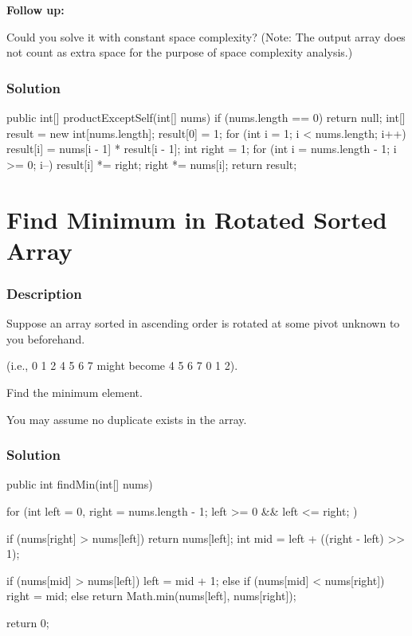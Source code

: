\textbf{Follow up:}

Could you solve it with constant space complexity? (Note: The output array does not count as extra space for the purpose of space complexity analysis.)

\subsubsection{Solution}

\begin{Code}
public int[] productExceptSelf(int[] nums) {
    if (nums.length == 0) {
        return null;
    }
    int[] result = new int[nums.length];
    result[0] = 1;
    for (int i = 1; i < nums.length; i++) {
        result[i] = nums[i - 1] * result[i - 1];
    }
    int right = 1;
    for (int i = nums.length - 1; i >= 0; i--) {
        result[i] *= right;
        right *= nums[i];
    }
    return result;
}
\end{Code}

\newpage

\section{Find Minimum in Rotated Sorted Array} %

\subsubsection{Description}
Suppose an array sorted in ascending order is rotated at some pivot unknown to you beforehand.

(i.e., 0 1 2 4 5 6 7 might become 4 5 6 7 0 1 2).

Find the minimum element.

You may assume no duplicate exists in the array.
\subsubsection{Solution}

\begin{Code}
public int findMin(int[] nums) {
    for (int left = 0, right = nums.length - 1; left >= 0 && left <= right; ) {
        if (nums[right] > nums[left]) {
            return nums[left];
        }
        int mid = left + ((right - left) >> 1);

        if (nums[mid] > nums[left]) {
            left = mid + 1;
        } else if (nums[mid] < nums[right]) {
            right = mid;
        } else {
            return Math.min(nums[left], nums[right]);
        }
    }
    return 0;
}
\end{Code}

